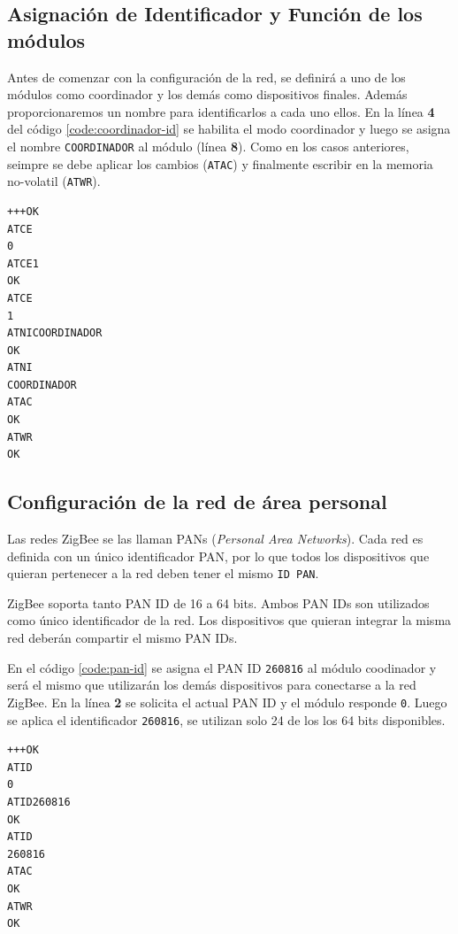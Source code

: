 \documentclass[11pt,oneside,spanish,a4paper]{article}
\begin{document}
\subsection{Asignación de Identificador y Función de los módulos}

Antes de comenzar con la configuración de la red, se definirá a uno de
los módulos como coordinador y los demás como dispositivos
finales. Además proporcionaremos un nombre para identificarlos a cada
uno ellos. En la línea \textbf{4} del código
\ref{code:coordinador-id}  se habilita el modo coordinador y luego se
asigna el nombre \texttt{COORDINADOR} al módulo (línea \textbf{8}).
 Como en los casos anteriores, seimpre se debe aplicar los cambios (\texttt{ATAC}) y
finalmente escribir en la memoria no-volatil (\texttt{ATWR}).
\begin{lstlisting}[emph={+++,ATCE,ATCE1,ATWR,ATAC,ATNI,ATCOORDINADOR},
    emphstyle={\color{blue}}, caption={Obtención del \textsl{seral
number}.}, label=code:coordinador-id]
+++OK
ATCE
0
ATCE1
OK
ATCE
1
ATNICOORDINADOR
OK
ATNI
COORDINADOR
ATAC
OK
ATWR
OK
\end{lstlisting}  

\subsection[Configuración PAN]{Configuración de la red de área personal}

Las redes ZigBee se las llaman PANs (\textsl{Personal Area
  Networks}). Cada red es definida con un único identificador PAN, por
lo que todos los dispositivos que quieran pertenecer a la red deben
tener el mismo \texttt{ID PAN}. 

ZigBee soporta tanto PAN ID de 16 a 64 bits. Ambos PAN IDs son
utilizados como único identificador de la red. Los dispositivos que
quieran integrar la misma red deberán compartir el mismo PAN IDs. 

En el código \ref{code:pan-id} se asigna el PAN ID \texttt{260816} al
módulo coodinador y será el mismo que utilizarán los demás
dispositivos para conectarse a la red ZigBee. En la línea \textbf{2}
se solicita el actual PAN ID y el módulo responde \texttt{0}. Luego se
aplica el identificador \texttt{260816}, se utilizan solo 24 de los
los 64 bits disponibles. 

\begin{lstlisting}[emph={+++,ATWR,ATAC,ATID,ATID260816},
    emphstyle={\color{blue}}, caption={Obtención del \textsl{serial
number}.}, label=code:pan-id]
+++OK
ATID
0
ATID260816
OK
ATID
260816
ATAC
OK
ATWR
OK
\end{lstlisting}  
\end{document}
